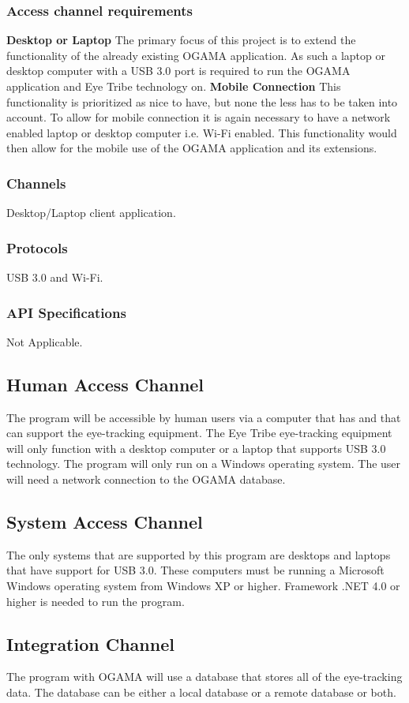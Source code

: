 \subsubsection{Access channel requirements}
\textbf{Desktop or Laptop}
\newline
The primary focus of this project is to extend the functionality of the already existing OGAMA application. As such a laptop or desktop computer with a USB 3.0 port is required to run the OGAMA application and Eye Tribe technology on.
\newline
\textbf{Mobile Connection}
\newline
 This functionality is prioritized as nice to have, but none the less has to be taken into account. To allow for mobile connection it is again necessary to have a network enabled laptop or desktop computer i.e. Wi-Fi enabled. This functionality would then allow for the mobile use of the OGAMA application and its extensions.\newline 

\subsubsection{Channels}
Desktop/Laptop client application.
\subsubsection{Protocols}
USB 3.0 and Wi-Fi.
\subsubsection{API Specifications}
Not Applicable.

\subsection{Human Access Channel}
    The program will be accessible by human users via a computer that has and that can support the eye-tracking equipment. The Eye Tribe eye-tracking equipment will only function with a desktop computer or a laptop that supports USB 3.0 technology. The program will only run on a Windows operating system. The user will need a network connection to the OGAMA database.
\subsection{System Access Channel}
    The only systems that are supported by this program are desktops and laptops that have support for USB 3.0. These computers must be running a Microsoft Windows operating system from Windows XP or higher. Framework .NET 4.0 or higher is needed to run the program.
\subsection{Integration Channel}
    The program with OGAMA will use a database that stores all of the eye-tracking data. The database can be either a local database or a remote database or both.
